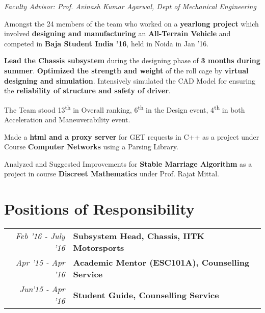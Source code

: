 \documentclass[a4paper]{norm-resume}
\begin{document}
    \vspace{1mm}
    
    	
    \emph{Faculty Advisor: Prof. Avinash Kumar Agarwal, Dept of Mechanical Engineering}
    \begin{tightitemize}
    \small
    {
    \item Amongst the 24 members of the team who worked on a \textbf{yearlong project} which involved \textbf{designing and manufacturing} an \textbf{All-Terrain Vehicle} and competed in \textbf{Baja Student India ’16}, held in Noida in Jan ’16.
    \item \textbf{Lead the Chassis subsystem} during the designing phase of \textbf{3 months during summer}. \textbf{Optimized the strength and weight} of the roll cage by \textbf{virtual designing and simulation}. Intensively simulated the CAD Model for ensuring the \textbf{reliability of structure and safety of driver}.
    }
    \item The Team stood 13\textsuperscript{th} in Overall ranking, 6\textsuperscript{th} in the Design event, 4\textsuperscript{th} in both Acceleration and Maneuverability event.
    \end{tightitemize}

    \vspace{1mm}

    \begin{tightitemize}
    \small
    {
    \item Made a \textbf{html and a proxy server} for GET requests in C++ as a project under Course \textbf{Computer Networks} using a Parsing Library.
    \item Analyzed and Suggested Improvements for \textbf{Stable Marriage Algorithm} as a project in course \textbf{Discreet Mathematics} under Prof. Rajat Mittal. 
    }
    \end{tightitemize}      


\section{Positions of Responsibility \hrulefill}
        
    \begin{tabular}{r|p{16cm}}  
    
    \normalsize\emph{Feb '16 - July '16} & \normalsize\textbf{Subsystem Head, Chassis, IITK Motorsports}\\
    \normalsize\emph{Apr '15 - Apr '16} & \normalsize\textbf{Academic Mentor (ESC101A), Counselling Service}\\ 
    \normalsize\emph{Jun'15 - Apr '16} & \normalsize\textbf{Student Guide, Counselling Service}
    \end{tabular}
\end{document}
